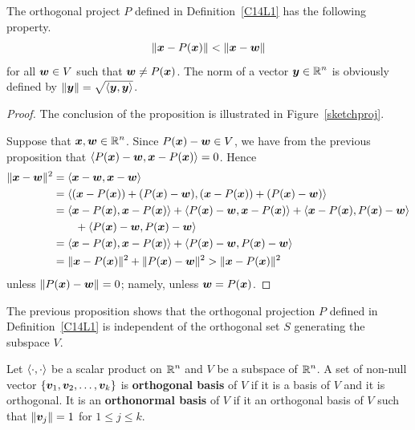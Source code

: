 
\begin{prop}
The orthogonal project $P$ defined in Definition~\ref{C14L1} has
the following property.
\[
  \|\bm{x} - P(\bm{x})\| < \|\bm{x} - \bm{w}\|
\]
for all $\bm{w} \in V$ such that $\bm{w} \neq P(\bm{x})$.  The norm
of a vector $\displaystyle \bm{y}\in \mathbb{R}^n$ is obviously defined by
$\|\bm{y}\| = \sqrt{\left\langle{\bm{y}} , {\bm{y}}\right\rangle}$.
\end{prop}

\begin{proof}
The conclusion of the proposition is illustrated in
Figure~\ref{sketchproj}.

Suppose that $\displaystyle \bm{x}, \bm{w} \in \mathbb{R}^n$.
Since $P(\bm{x})- \bm{w} \in V$, we have from the previous
proposition that $\left\langle{P(\bm{x})- \bm{w}} , {\bm{x} - P(\bm{x})}\right\rangle = 0$.
Hence
\begin{align*}
\|\bm{x} - \bm{w}\|^2 &= \left\langle{\bm{x} - \bm{w}} , {\bm{x} - \bm{w}}\right\rangle \\
& = \left\langle{(\bm{x} - P(\bm{x})) + (P(\bm{x})- \bm{w})} , {(\bm{x} - P(\bm{x})) + (P(\bm{x})- \bm{w})}\right\rangle \\
& = \left\langle{\bm{x} - P(\bm{x})} , {\bm{x} - P(\bm{x})}\right\rangle
+ \left\langle{P(\bm{x})- \bm{w}} , {\bm{x} - P(\bm{x})}\right\rangle
+ \left\langle{\bm{x} - P(\bm{x})} , {P(\bm{x})- \bm{w}}\right\rangle \\
&\qquad + \left\langle{P(\bm{x})- \bm{w}} , {P(\bm{x})- \bm{w}}\right\rangle \\
& = \left\langle{\bm{x} - P(\bm{x})} , {\bm{x} - P(\bm{x})}\right\rangle
+ \left\langle{P(\bm{x})- \bm{w}} , {P(\bm{x})- \bm{w}}\right\rangle \\
& = \|\bm{x} - P(\bm{x})\|^2 + \|P(\bm{x})- \bm{w}\|^2
> \|\bm{x} - P(\bm{x})\|^2
\end{align*}
unless $\|P(\bm{x}) - \bm{w}\| = 0$; namely, unless
$\bm{w} = P(\bm{x})$.
\end{proof}

\begin{rmk}
The previous proposition shows that the orthogonal projection $P$
defined in Definition~\ref{C14L1} is independent of the
orthogonal set $S$ generating the subspace $V$.
\end{rmk}

\begin{defn}
Let $\left\langle{\cdot} , {\cdot}\right\rangle$ be a scalar product on $\displaystyle \mathbb{R}^n$
and $V$ be a subspace of $\displaystyle \mathbb{R}^n$.  A set of non-null vector
$\{\bm{v}_1, \bm{v}_2, \ldots , \bm{v}_k\}$ is
{\bfseries orthogonal basis} of $V$ if
it is a basis of $V$ and it is orthogonal.  It is an {\bfseries
  orthonormal basis} of $V$ if it 
an orthogonal basis of $V$ such that $\|\bm{v}_j\| = 1$ for
$1 \leq j \leq k$.
\end{defn}

